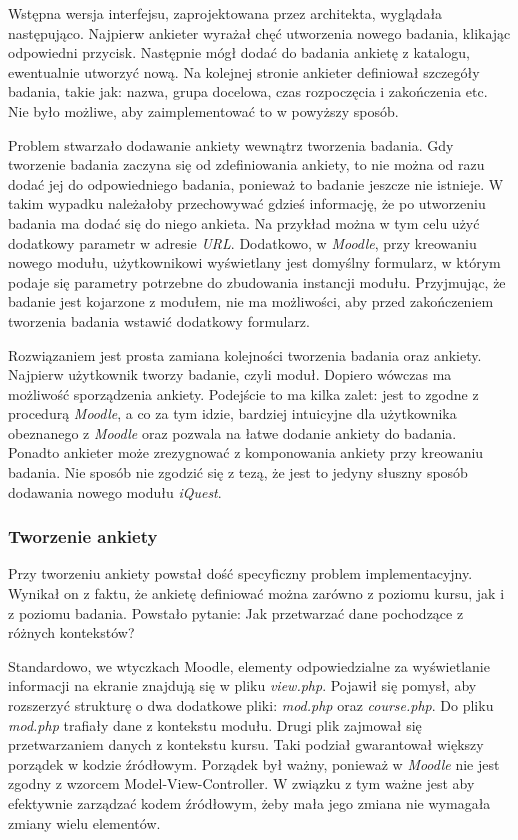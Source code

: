 Wstępna wersja interfejsu, zaprojektowana przez architekta, wyglądała następująco. Najpierw ankieter wyrażał chęć utworzenia nowego badania, klikając odpowiedni przycisk. Następnie mógł dodać do badania ankietę z katalogu, ewentualnie utworzyć nową. Na kolejnej stronie ankieter definiował szczegóły badania, takie jak: nazwa, grupa docelowa, czas rozpoczęcia i zakończenia etc. Nie było możliwe, aby zaimplementować to w powyższy sposób.

Problem stwarzało dodawanie ankiety wewnątrz tworzenia badania. Gdy tworzenie badania zaczyna się od zdefiniowania ankiety, to nie można od razu dodać jej do odpowiedniego badania, ponieważ to badanie jeszcze nie istnieje. W takim wypadku należałoby przechowywać gdzieś informację, że po utworzeniu badania ma dodać się do niego ankieta. Na przykład można w tym celu użyć dodatkowy parametr w adresie \emph{URL}. Dodatkowo, w \emph{Moodle}, przy kreowaniu nowego modułu, użytkownikowi wyświetlany jest domyślny formularz, w którym podaje się parametry potrzebne do zbudowania instancji modułu. Przyjmując, że badanie jest kojarzone z modułem, nie ma możliwości, aby przed zakończeniem tworzenia badania wstawić dodatkowy formularz.

Rozwiązaniem jest prosta zamiana kolejności tworzenia badania oraz ankiety. Najpierw użytkownik tworzy badanie, czyli moduł. Dopiero wówczas ma możliwość sporządzenia ankiety. Podejście to ma kilka zalet: jest to zgodne z procedurą \emph{Moodle}, a co za tym idzie, bardziej intuicyjne dla użytkownika obeznanego z \emph{Moodle} oraz pozwala na łatwe dodanie ankiety do badania. Ponadto ankieter może zrezygnować z komponowania ankiety przy kreowaniu badania. Nie sposób nie zgodzić się z tezą, że jest to jedyny słuszny sposób dodawania nowego modułu \emph{iQuest}.

\subsubsection{Tworzenie ankiety}
Przy tworzeniu ankiety powstał dość specyficzny problem implementacyjny. Wynikał on z faktu, że ankietę definiować można zarówno z poziomu kursu, jak i z poziomu badania. Powstało pytanie: Jak przetwarzać dane pochodzące z różnych kontekstów? 

Standardowo, we wtyczkach Moodle, elementy odpowiedzialne za wyświetlanie informacji na ekranie znajdują się w pliku \emph{view.php}. Pojawił się pomysł, aby rozszerzyć strukturę o dwa dodatkowe pliki: \emph{mod.php} oraz \emph{course.php}. Do pliku \emph{mod.php} trafiały dane z kontekstu modułu. Drugi plik zajmował się przetwarzaniem danych z kontekstu kursu. Taki podział gwarantował większy porządek w kodzie źródłowym. Porządek był ważny, ponieważ w \emph{Moodle} nie jest zgodny z wzorcem Model-View-Controller. W związku z tym ważne jest aby efektywnie zarządzać kodem źródłowym, żeby mała jego zmiana nie wymagała zmiany wielu elementów.

